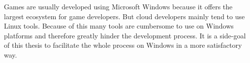 Games are usually developed using Microsoft Windows because it offers the
largest ecosystem for game developers. But cloud developers mainly tend to use 
Linux tools. Because of this many tools are cumbersome to use on Windows
platforms and therefore greatly hinder the development process. It is a
side-goal of this thesis to facilitate the whole process on Windows in a more
satisfactory way.\\





















